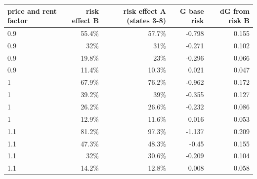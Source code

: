 \begin{tabular}{lrrrr}
\toprule
price and rent factor & risk effect B & risk effect A (states 3-8) & G base risk & dG from risk B \\
\midrule
0.9 & 55.4\% & 57.7\% & -0.798 & 0.155 \\
0.9 & 32\% & 31\% & -0.271 & 0.102 \\
0.9 & 19.8\% & 23\% & -0.296 & 0.066 \\
0.9 & 11.4\% & 10.3\% & 0.021 & 0.047 \\
1 & 67.9\% & 76.2\% & -0.962 & 0.172 \\
1 & 39.2\% & 39\% & -0.355 & 0.127 \\
1 & 26.2\% & 26.6\% & -0.232 & 0.086 \\
1 & 12.9\% & 11.6\% & 0.016 & 0.053 \\
1.1 & 81.2\% & 97.3\% & -1.137 & 0.209 \\
1.1 & 47.3\% & 48.3\% & -0.45 & 0.155 \\
1.1 & 32\% & 30.6\% & -0.209 & 0.104 \\
1.1 & 14.2\% & 12.8\% & 0.008 & 0.058 \\
\bottomrule
\end{tabular}
